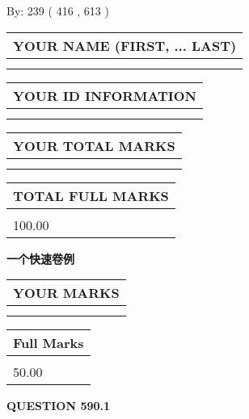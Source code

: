 \documentclass{ctexart}
\begin{document}
   
\hspace{1.0in} By: 
 239 ( 416 ,  613 )
   
   
   
   
\newpage 
\setcounter{page}{ 
   590001 } 
   
   
   
   
\noindent\begin{tabular}{|l|}
\hline
YOUR NAME (FIRST, ... LAST)  \\
\hline
 \\ 
 \\ 
\hline
\end{tabular}
\hspace{0.05in} \begin{tabular}{|l|}
\hline
 YOUR   ID   INFORMATION  \\
\hline
 \\ 
 \\ 
\hline
\end{tabular}
   
   
\vspace{0.2in}\noindent\begin{tabular}{|l|}
\hline
YOUR TOTAL MARKS  \\
\hline
 \\ 
 \\ 
\hline
\end{tabular}
\hspace{0.05in} \begin{tabular}{|l|}
\hline
TOTAL FULL MARKS  \\
\hline
 \\ 
100.00 \\
\hline
\end{tabular}
   
   
 \vspace{0.2in}
{\LARGE {\textbf{ 一个快速卷例}}}
   
   
  
\vspace{0.2in}
  
\noindent\begin{tabular}{|l|}
\hline
 YOUR MARKS  \\
\hline
 \\ 
 \\ 
\hline
\end{tabular}
\hspace{0.05in} \begin{tabular}{|l|}
\hline
 Full Marks  \\
\hline
 \\ 
50.00 \\
\hline
\end{tabular}
{\textbf{\Large{QUESTION
590.1 
}}}
  
\end{document}

